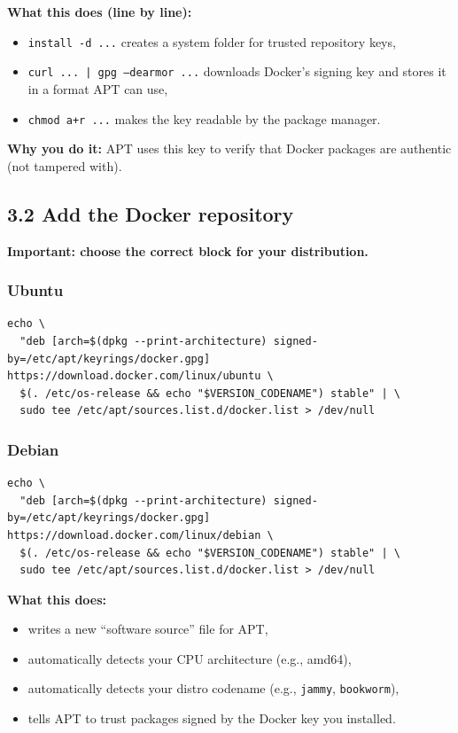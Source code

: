 \textbf{What this does (line by line):}
\begin{itemize}[leftmargin=*]
  \item \texttt{install -d ...} creates a system folder for trusted repository keys,
  \item \texttt{curl ... | gpg --dearmor ...} downloads Docker's signing key and stores it in a format APT can use,
  \item \texttt{chmod a+r ...} makes the key readable by the package manager.
\end{itemize}

\textbf{Why you do it:} APT uses this key to verify that Docker packages are authentic (not tampered with).

\subsection{3.2 Add the Docker repository}
\textbf{Important: choose the correct block for your distribution.}

\subsubsection*{Ubuntu}
\begin{lstlisting}
echo \
  "deb [arch=$(dpkg --print-architecture) signed-by=/etc/apt/keyrings/docker.gpg] https://download.docker.com/linux/ubuntu \
  $(. /etc/os-release && echo "$VERSION_CODENAME") stable" | \
  sudo tee /etc/apt/sources.list.d/docker.list > /dev/null
\end{lstlisting}

\subsubsection*{Debian}
\begin{lstlisting}
echo \
  "deb [arch=$(dpkg --print-architecture) signed-by=/etc/apt/keyrings/docker.gpg] https://download.docker.com/linux/debian \
  $(. /etc/os-release && echo "$VERSION_CODENAME") stable" | \
  sudo tee /etc/apt/sources.list.d/docker.list > /dev/null
\end{lstlisting}

\textbf{What this does:}
\begin{itemize}[leftmargin=*]
  \item writes a new ``software source'' file for APT,
  \item automatically detects your CPU architecture (e.g., amd64),
  \item automatically detects your distro codename (e.g., \texttt{jammy}, \texttt{bookworm}),
  \item tells APT to trust packages signed by the Docker key you installed.
\end{itemize}


